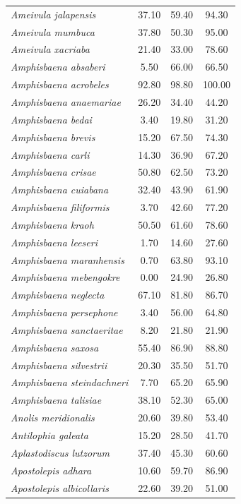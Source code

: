 \documentclass[12pt,openright,oneside,a4paper,english]{abntex2}
\begin{document}
\begin{longtable}{lccc}
	\textit{Ameivula jalapensis}&37.10 &59.40 &94.30 \\
	\textit{Ameivula mumbuca}&37.80 &50.30 &95.00 \\
	\textit{Ameivula xacriaba}&21.40 &33.00 &78.60 \\
	\textit{Amphisbaena absaberi}&5.50 &66.00 &66.50 \\
	\textit{Amphisbaena acrobeles}&92.80 &98.80 &100.00 \\
	\textit{Amphisbaena anaemariae}&26.20 &34.40 &44.20 \\
	\textit{Amphisbaena bedai}&3.40 &19.80 &31.20 \\
	\textit{Amphisbaena brevis}&15.20 &67.50 &74.30 \\
	\textit{Amphisbaena carli}&14.30 &36.90 &67.20 \\
	\textit{Amphisbaena crisae}&50.80 &62.50 &73.20 \\
	\textit{Amphisbaena cuiabana}&32.40 &43.90 &61.90 \\
	\textit{Amphisbaena filiformis}&3.70 &42.60 &77.20 \\
	\textit{Amphisbaena kraoh}&50.50 &61.60 &78.60 \\
	\textit{Amphisbaena leeseri}&1.70 &14.60 &27.60 \\
	\textit{Amphisbaena maranhensis}&0.70 &63.80 &93.10 \\
	\textit{Amphisbaena mebengokre}&0.00 &24.90 &26.80 \\
	\textit{Amphisbaena neglecta}&67.10 &81.80 &86.70 \\
	\textit{Amphisbaena persephone}&3.40 &56.00 &64.80 \\
	\textit{Amphisbaena sanctaeritae}&8.20 &21.80 &21.90 \\
	\textit{Amphisbaena saxosa}&55.40 &86.90 &88.80 \\
	\textit{Amphisbaena silvestrii}&20.30 &35.50 &51.70 \\
	\textit{Amphisbaena steindachneri}&7.70 &65.20 &65.90 \\
	\textit{Amphisbaena talisiae}&38.10 &52.30 &65.00 \\
	\textit{Anolis meridionalis}&20.60 &39.80 &53.40 \\
	\textit{Antilophia galeata}&15.20 &28.50 &41.70 \\
	\textit{Aplastodiscus lutzorum}&37.40 &45.30 &60.60 \\
	\textit{Apostolepis adhara}&10.60 &59.70 &86.90 \\
	\textit{Apostolepis albicollaris}&22.60 &39.20 &51.00 \\

\end{longtable}
\end{document}
